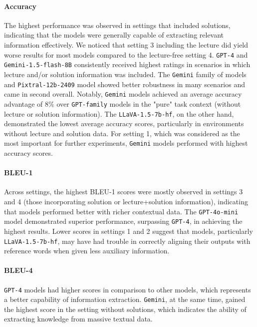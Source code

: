 \documentclass{article}
\begin{document}
\paragraph{Accuracy}


The highest performance was observed in settings that included solutions, indicating that the models were generally capable of extracting relevant information effectively. %
We noticed that setting 3 including the lecture did yield worse results for most models compared to the lecture-free setting 4.
\texttt{GPT-4} and \texttt{Gemini-1.5-flash-8B} consistently received highest ratings in scenarios in which lecture and/or solution information was included. The \texttt{Gemini} family of models and  \texttt{Pixtral-12b-2409} model showed better robustness in many scenarios and came in second overall. Notably, \texttt{Gemini} models achieved an average accuracy advantage of 8\% over \texttt{GPT-family} models in the "pure" task context (without lecture or solution information). The \texttt{LLaVA-1.5-7b-hf}, on the other hand, demonstrated the lowest average accuracy scores, particularly in environments without lecture and solution data. For setting 1, which was considered as the most important for further experiments, \texttt{Gemini} models performed with highest accuracy scores.

\paragraph{BLEU-1}
Across settings, the highest BLEU-1 scores were mostly observed in settings 3 and 4 (those incorporating solution or lecture+solution information), indicating that models performed better with richer contextual data. The \texttt{GPT-4o-mini} model demonstrated superior performance, surpassing \texttt{GPT-4}, in achieving the highest results. Lower scores in settings 1 and 2 suggest that models, particularly \texttt{LLaVA-1.5-7b-hf}, may have had trouble in correctly aligning their outputs with reference words when given less auxiliary information. 

\paragraph{BLEU-4}
\texttt{GPT-4} models had higher scores in comparison to other models, which represents a better capability of information extraction. \texttt{Gemini}, at the same time, gained the highest score in the setting without solutions, which indicates the ability of extracting knowledge from massive textual data.
\end{document}
